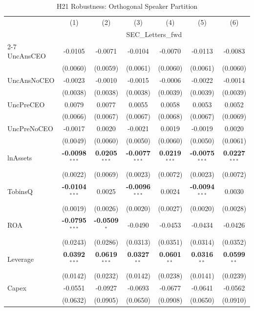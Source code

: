 \documentclass[11pt,a4paper]{article}
\begin{document}
\clearpage
\begin{table}[htbp]
\centering
\caption{H21 Robustness: Orthogonal Speaker Partition}
\label{tab:h21_robust}
\scriptsize
\begin{tabular}{lcccccc}
\toprule
 & (1) & (2) & (3) & (4) & (5) & (6) \\
 & \multicolumn{6}{c}{SEC\_Letters\_fwd} \\
\cmidrule(lr){2-7}
\midrule
UncAnsCEO & -0.0105 & -0.0071 & -0.0104 & -0.0070 & -0.0113 & -0.0083 \\
 & (0.0060) & (0.0059) & (0.0061) & (0.0060) & (0.0061) & (0.0060) \\
UncAnsNoCEO & -0.0023 & -0.0010 & -0.0015 & -0.0006 & -0.0022 & -0.0014 \\
 & (0.0038) & (0.0038) & (0.0038) & (0.0039) & (0.0039) & (0.0039) \\
UncPreCEO & 0.0079 & 0.0077 & 0.0055 & 0.0058 & 0.0053 & 0.0052 \\
 & (0.0066) & (0.0067) & (0.0067) & (0.0068) & (0.0067) & (0.0069) \\
UncPreNoCEO & -0.0017 & 0.0020 & -0.0021 & 0.0019 & -0.0019 & 0.0020 \\
 & (0.0049) & (0.0060) & (0.0050) & (0.0060) & (0.0050) & (0.0061) \\
\midrule
lnAssets & \textbf{-0.0098}$^{***}$ & \textbf{0.0205}$^{***}$ & \textbf{-0.0077}$^{***}$ & \textbf{0.0219}$^{***}$ & \textbf{-0.0075}$^{***}$ & \textbf{0.0227}$^{***}$ \\
 & (0.0022) & (0.0069) & (0.0023) & (0.0072) & (0.0023) & (0.0072) \\
TobinsQ & \textbf{-0.0104}$^{***}$ & 0.0025 & \textbf{-0.0096}$^{***}$ & 0.0024 & \textbf{-0.0094}$^{***}$ & 0.0030 \\
 & (0.0019) & (0.0026) & (0.0020) & (0.0027) & (0.0020) & (0.0028) \\
ROA & \textbf{-0.0795}$^{***}$ & \textbf{-0.0509}$^{*}$ & -0.0490 & -0.0453 & -0.0434 & -0.0426 \\
 & (0.0243) & (0.0286) & (0.0313) & (0.0351) & (0.0314) & (0.0352) \\
Leverage & \textbf{0.0392}$^{***}$ & \textbf{0.0619}$^{***}$ & \textbf{0.0327}$^{**}$ & \textbf{0.0601}$^{**}$ & \textbf{0.0316}$^{**}$ & \textbf{0.0599}$^{**}$ \\
 & (0.0142) & (0.0232) & (0.0142) & (0.0238) & (0.0141) & (0.0239) \\
Capex & -0.0551 & -0.0927 & -0.0693 & -0.0677 & -0.0641 & -0.0562 \\
 & (0.0632) & (0.0905) & (0.0650) & (0.0908) & (0.0650) & (0.0910) \\

\end{tabular}
\end{table}
\end{document}
